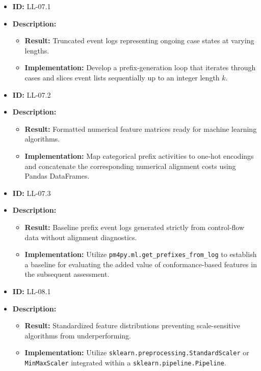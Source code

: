 \documentclass[12pt,a4paper]{article}
\begin{document}
\begin{itemize}
    \item \textbf{ID:} LL-07.1
    \item \textbf{Description:}
    \begin{itemize}
        \item \textbf{Result:} Truncated event logs representing ongoing case states at varying lengths.
        \item \textbf{Implementation:} Develop a prefix-generation loop that iterates through cases and slices event lists sequentially up to an integer length $k$.
    \end{itemize}
\end{itemize}
\vspace{1.5em}

\begin{itemize}
    \item \textbf{ID:} LL-07.2
    \item \textbf{Description:}
    \begin{itemize}
        \item \textbf{Result:} Formatted numerical feature matrices ready for machine learning algorithms.
        \item \textbf{Implementation:} Map categorical prefix activities to one-hot encodings and concatenate the corresponding numerical alignment costs using Pandas DataFrames.
    \end{itemize}
\end{itemize}
\vspace{1.5em}

\begin{itemize}
    \item \textbf{ID:} LL-07.3
    \item \textbf{Description:}
    \begin{itemize}
        \item \textbf{Result:} Baseline prefix event logs generated strictly from control-flow data without alignment diagnostics.
        \item \textbf{Implementation:} Utilize \texttt{pm4py.ml.get\_prefixes\_from\_log} to establish a baseline for evaluating the added value of conformance-based features in the subsequent assessment.
    \end{itemize}
\end{itemize}
\vspace{1.5em}

\begin{itemize}
    \item \textbf{ID:} LL-08.1
    \item \textbf{Description:}
    \begin{itemize}
        \item \textbf{Result:} Standardized feature distributions preventing scale-sensitive algorithms from underperforming.
        \item \textbf{Implementation:} Utilize \texttt{sklearn.preprocessing.StandardScaler} or \texttt{MinMaxScaler} integrated within a \texttt{sklearn.pipeline.Pipeline}.
    \end{itemize}
\end{itemize}
\vspace{1.5em}
\end{document}
